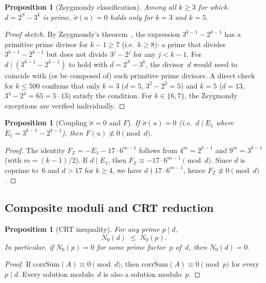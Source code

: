 \documentclass[12pt, a4paper]{amsart}
\theoremstyle{plain}
\newtheorem{proposition}[theorem]{Proposition}
\theoremstyle{definition}
\theoremstyle{remark}
\newcommand{\Z}{\mathbb{Z}}
\newcommand{\corrSum}{\mathrm{corrSum}}
\begin{document}
\begin{proposition}[Zsygmondy classification]%
\label{prop:sigma-zero-finite}
  Among all $k \geq 3$ for which $d = 2^S - 3^k$ is prime,
  $\tilde\sigma(u) = 0$ holds only for $k = 3$ and $k = 5$.
\end{proposition}

\begin{proof}[Proof sketch]
  By Zsygmondy's theorem~\cite{Zsygmondy1892},
  the expression $3^{k-1} - 2^{k-1}$ has a primitive
  prime divisor for $k - 1 \geq 7$ (i.e.\ $k \geq 8$):
  a prime that divides $3^{k-1} - 2^{k-1}$ but
  does not divide $3^j - 2^j$ for any $j < k - 1$.
  For $d \mid (3^{k-1} - 2^{k-1})$ to hold with
  $d = 2^S - 3^k$, the divisor~$d$ would need to coincide
  with (or be composed of) such primitive prime divisors.
  A direct check for $k \leq 500$ confirms that only
  $k = 3$ ($d = 5$, $3^2 - 2^2 = 5$) and
  $k = 5$ ($d = 13$, $3^4 - 2^4 = 65 = 5 \cdot 13$)
  satisfy the condition.
  For $k \in \{6, 7\}$, the Zsygmondy exceptions are
  verified individually.
\end{proof}

\begin{proposition}[Coupling $\tilde\sigma = 0$
and $F$]\label{prop:G1-G2a}
  If $\tilde\sigma(u) = 0$ (i.e.\ $d \mid E_1$ where
  $E_1 = 3^{k-1} - 2^{k-1}$), then $F(u) \not\equiv 0
  \pmod{d}$.
\end{proposition}

\begin{proof}
  The identity $F_\Z = -E_1 - 17 \cdot 6^{m-1}$
  follows from $4^m = 2^{k-1}$ and $9^m = 3^{k-1}$
  (with $m = (k-1)/2$).
  If $d \mid E_1$, then
  $F_\Z \equiv -17 \cdot 6^{m-1} \pmod{d}$.
  Since $d$ is coprime to~$6$ and $d > 17$ for $k \geq 4$,
  we have $d \nmid 17 \cdot 6^{m-1}$,
  hence $F_\Z \not\equiv 0 \pmod{d}$.
\end{proof}

\subsection{Composite moduli and CRT reduction}%
\label{ssec:crt-composite}

\begin{proposition}[CRT inequality]\label{prop:crt}
  For any prime $p \mid d$,
  \[
    N_0(d) \;\leq\; N_0(p).
  \]
  In particular, if $N_0(p) = 0$ for some prime factor~$p$
  of~$d$, then $N_0(d) = 0$.
\end{proposition}

\begin{proof}
  If $\corrSum(A) \equiv 0 \pmod{d}$, then
  $\corrSum(A) \equiv 0 \pmod{p}$ for every $p \mid d$.
  Every solution modulo~$d$ is also a solution modulo~$p$.
\end{proof}
\end{document}
